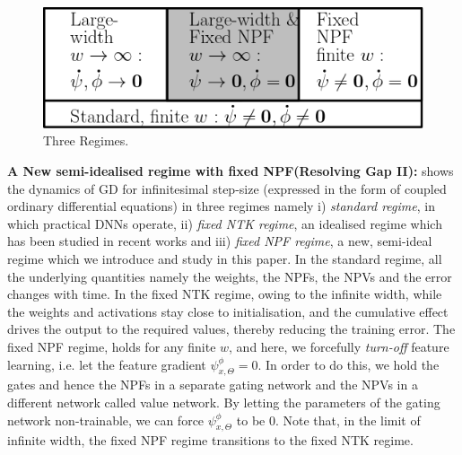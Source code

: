 \begin{figure}
\includegraphics[scale=0.25]{figs/regime.png}
\caption{\label{fig:regime}Three Regimes.}
\end{figure}
\textbf{A New semi-idealised regime with fixed NPF(Resolving Gap II):}  shows the dynamics of GD for infinitesimal step-size (expressed in the form of coupled ordinary differential equations) in three regimes namely i) \emph{standard regime}, in  which practical DNNs operate, ii) \emph{fixed NTK regime}, an idealised regime which has been studied in recent works and iii) \emph{fixed NPF regime}, a new, semi-ideal regime which we introduce and study in this paper. In the standard regime, all the underlying quantities namely the weights, the NPFs, the NPVs and the error changes with time. In the fixed NTK regime, owing to the infinite width, while the weights and activations stay close to initialisation, and the cumulative effect drives the output to the required values, thereby reducing the training error. The fixed NPF regime, holds for any finite $w$, and here, we forcefully \emph{turn-off} feature learning, i.e. let the feature gradient $\psi^{\phi}_{x,\Theta}=0$. In order to do this, we hold the gates and hence the NPFs in a separate gating network and the NPVs in a different network called value network. By letting the parameters of the gating network non-trainable, we can force $\psi^{\phi}_{x,\Theta}$ to be $0$. Note that, in the limit of infinite width, the fixed NPF regime transitions to the fixed NTK regime. 

